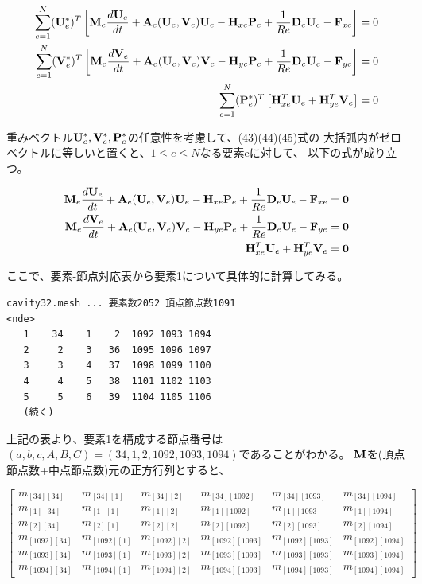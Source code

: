 \documentclass{jarticle}
\begin{document}
\begin{eqnarray}
  \sum_{e=1}^N({\bf U}_e^*)^T\left[{\bf M}_e\frac{d{\bf U}_e}{dt}+{\bf A}_e({\bf U}_e,{\bf V}_e){\bf U}_e
-{\bf H}_{xe}{\bf P}_e+\frac{1}{Re}{\bf D}_e{\bf U}_e-{\bf F}_{xe}\right]=0\\
  \sum_{e=1}^N({\bf V}_e^*)^T\left[{\bf M}_e\frac{d{\bf V}_e}{dt}+{\bf A}_e({\bf U}_e,{\bf V}_e){\bf V}_e
-{\bf H}_{ye}{\bf P}_e+\frac{1}{Re}{\bf D}_e{\bf U}_e-{\bf F}_{ye}\right]=0\\
  \sum_{e=1}^N({\bf P}_e^*)^T\left[{\bf H}_{xe}^T{\bf U}_e+{\bf H}_{ye}^T{\bf V}_e\right]=0
\end{eqnarray}

重みベクトル${\bf U}_e^*,{\bf V}_e^*,{\bf P}_e^*$の任意性を考慮して、(43)(44)(45)式の
大括弧内がゼロベクトルに等しいと置くと、$1\leq e\leq N$なる要素eに対して、
以下の式が成り立つ。


\begin{eqnarray}
 {\bf M}_e\frac{d{\bf U}_e}{dt}+{\bf A}_e({\bf U}_e,{\bf V}_e){\bf U}_e
-{\bf H}_{xe}{\bf P}_e+\frac{1}{Re}{\bf D}_e{\bf U}_e-{\bf F}_{xe}={\bf 0}\\
 {\bf M}_e\frac{d{\bf V}_e}{dt}+{\bf A}_e({\bf U}_e,{\bf V}_e){\bf V}_e
-{\bf H}_{ye}{\bf P}_e+\frac{1}{Re}{\bf D}_e{\bf U}_e-{\bf F}_{ye}={\bf 0}\\
 {\bf H}_{xe}^T{\bf U}_e+{\bf H}_{ye}^T{\bf V}_e={\bf 0}
\end{eqnarray}

ここで、要素-節点対応表から要素1について具体的に計算してみる。
\begin{verbatim}
cavity32.mesh ... 要素数2052 頂点節点数1091
<nde>
   1    34    1    2  1092 1093 1094
   2     2    3   36  1095 1096 1097
   3     3    4   37  1098 1099 1100
   4     4    5   38  1101 1102 1103
   5     5    6   39  1104 1105 1106
   (続く)
\end{verbatim}
上記の表より、要素1を構成する節点番号は $(a,b,c,A,B,C)=(34,1,2,1092,1093,1094)$であることがわかる。
${\bf M}$を(頂点節点数+中点節点数)元の正方行列とすると、

\[
\left[\begin{array}{cccccc}
m_{[34][34]} & m_{[34][1]} & m_{[34][2]} & m_{[34][1092]} & m_{[34][1093]} & m_{[34][1094]}\\
m_{[ 1][34]} & m_{[1][1]} & m_{[1][2]} & m_{[1][1092]} & m_{[1][1093]} & m_{[1][1094]}\\
m_{[ 2][34]} & m_{[2][1]} & m_{[2][2]} & m_{[2][1092]} & m_{[2][1093]} & m_{[2][1094]}\\
m_{[1092][34]} & m_{[1092][1]} & m_{[1092][2]} & m_{[1092][1093]} & m_{[1092][1093]}&m_{[1092][1094]}\\
m_{[1093][34]} & m_{[1093][1]} & m_{[1093][2]} & m_{[1093][1093]} & m_{[1093][1093]}&m_{[1093][1094]}\\
m_{[1094][34]} & m_{[1094][1]} & m_{[1094][2]} & m_{[1094][1093]} & m_{[1094][1093]}&m_{[1094][1094]}
\end{array}\right]
\]
\end{document}
